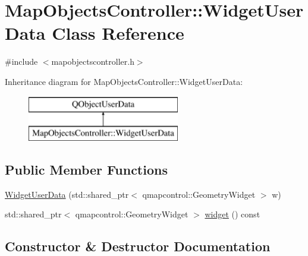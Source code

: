 \hypertarget{class_map_objects_controller_1_1_widget_user_data}{}\section{Map\+Objects\+Controller\+::Widget\+User\+Data Class Reference}
\label{class_map_objects_controller_1_1_widget_user_data}


{\ttfamily \#include $<$mapobjectscontroller.\+h$>$}

Inheritance diagram for Map\+Objects\+Controller\+::Widget\+User\+Data\+:\begin{figure}[H]
\begin{center}
\leavevmode
\includegraphics[height=2.000000cm]{dc/d7a/class_map_objects_controller_1_1_widget_user_data}
\end{center}
\end{figure}
\subsection*{Public Member Functions}
\begin{DoxyCompactItemize}
\item 
\mbox{\hyperlink{class_map_objects_controller_1_1_widget_user_data_adcb958886db37aab77a6532c8ee12a5b}{Widget\+User\+Data}} (std\+::shared\+\_\+ptr$<$ qmapcontrol\+::\+Geometry\+Widget $>$ w)
\item 
std\+::shared\+\_\+ptr$<$ qmapcontrol\+::\+Geometry\+Widget $>$ \mbox{\hyperlink{class_map_objects_controller_1_1_widget_user_data_a83ef8e3c0c08bfcd9293471f8c0153a9}{widget}} () const
\end{DoxyCompactItemize}


\subsection{Constructor \& Destructor Documentation}
\mbox{\label{class_map_objects_controller_1_1_widget_user_data_adcb958886db37aab77a6532c8ee12a5b}} 
